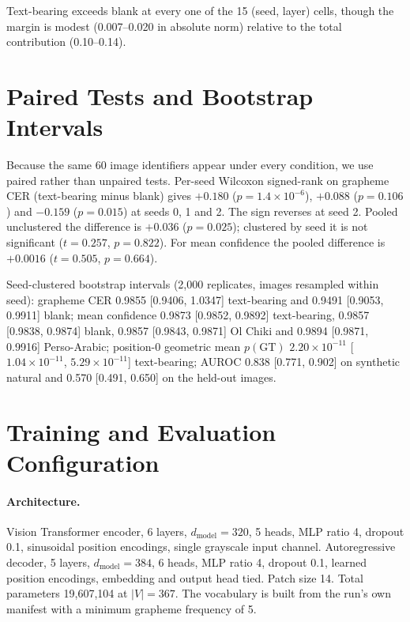 \documentclass{article}
\begin{document}
Text-bearing exceeds blank at every one of the 15 (seed, layer) cells, though the margin is
modest (0.007--0.020 in absolute norm) relative to the total contribution (0.10--0.14).

\section{Paired Tests and Bootstrap Intervals}
\label{app:stats}

Because the same 60 image identifiers appear under every condition, we use paired rather than
unpaired tests. Per-seed Wilcoxon signed-rank on grapheme CER (text-bearing minus blank) gives
$+0.180$ ($p = 1.4\times10^{-6}$), $+0.088$ ($p = 0.106$) and $-0.159$ ($p = 0.015$) at seeds
0, 1 and 2. The sign reverses at seed 2. Pooled unclustered the difference is $+0.036$
($p = 0.025$); clustered by seed it is not significant ($t = 0.257$, $p = 0.822$). For mean
confidence the pooled difference is $+0.0016$ ($t = 0.505$, $p = 0.664$).

Seed-clustered bootstrap intervals (2{,}000 replicates, images resampled within seed):
grapheme CER 0.9855 [0.9406, 1.0347] text-bearing and 0.9491 [0.9053, 0.9911] blank; mean confidence
0.9873 [0.9852, 0.9892] text-bearing, 0.9857 [0.9838, 0.9874] blank, 0.9857 [0.9843, 0.9871] Ol Chiki
and 0.9894 [0.9871, 0.9916] Perso-Arabic; position-0 geometric mean $p(\mathrm{GT})$
$2.20\times10^{-11}$ [$1.04\times10^{-11}$, $5.29\times10^{-11}$] text-bearing; AUROC 0.838
[0.771, 0.902] on synthetic natural and 0.570 [0.491, 0.650] on the held-out images.

\section{Training and Evaluation Configuration}
\label{app:config}

\paragraph{Architecture.} Vision Transformer encoder, 6 layers, $d_{\text{model}} = 320$, 5
heads, MLP ratio 4, dropout 0.1, sinusoidal position encodings, single grayscale input channel.
Autoregressive decoder, 5 layers, $d_{\text{model}} = 384$, 6 heads, MLP ratio 4, dropout 0.1,
learned position encodings, embedding and output head tied. Patch size 14. Total parameters
19{,}607{,}104 at $|V| = 367$. The vocabulary is built from the run's own manifest with a
minimum grapheme frequency of 5.
\end{document}
